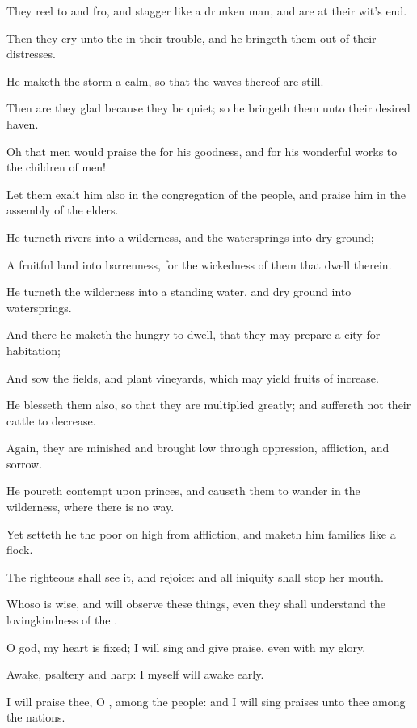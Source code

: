 \Verse They reel to and fro, and stagger like a drunken man, and are at their wit's end.

\Verse Then they cry unto the \LORD in their trouble, and he bringeth them out of their distresses.

\Verse He maketh the storm a calm, so that the waves thereof are still.

\Verse Then are they glad because they be quiet; so he bringeth them unto their desired haven.

\Verse Oh that men would praise the \LORD for his goodness, and for his wonderful works to the children of men!

\Verse Let them exalt him also in the congregation of the people, and praise him in the assembly of the elders.

\Verse He turneth rivers into a wilderness, and the watersprings into dry ground;

\Verse A fruitful land into barrenness, for the wickedness of them that dwell therein.

\Verse He turneth the wilderness into a standing water, and dry ground into watersprings.

\Verse And there he maketh the hungry to dwell, that they may prepare a city for habitation;

\Verse And sow the fields, and plant vineyards, which may yield fruits of increase.

\Verse He blesseth them also, so that they are multiplied greatly; and suffereth not their cattle to decrease.

\Verse Again, they are minished and brought low through oppression, affliction, and sorrow.

\Verse He poureth contempt upon princes, and causeth them to wander in the wilderness, where there is no way.

\Verse Yet setteth he the poor on high from affliction, and maketh him families like a flock.

\Verse The righteous shall see it, and rejoice: and all iniquity shall stop her mouth.

\Verse Whoso is wise, and will observe these things, even they shall understand the lovingkindness of the \LORD.




\Chapter
\Verse O god, my heart is fixed; I will sing and give praise, even with my glory.

\Verse Awake, psaltery and harp: I myself will awake early.

\Verse I will praise thee, O \LORD, among the people: and I will sing praises unto thee among the nations.

